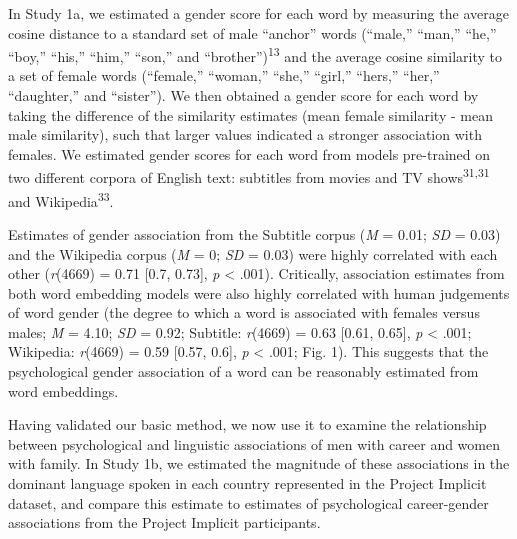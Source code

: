 \documentclass[11pt]{wlscirep}
\begin{document}
In Study 1a, we estimated a gender score for each word by measuring the average cosine distance to a standard set of
male \enquote{anchor} words (\enquote{male,} \enquote{man,}
\enquote{he,} \enquote{boy,} \enquote{his,} \enquote{him,}
\enquote{son,} and \enquote{brother})\textsuperscript{13}
and the average cosine similarity to a set of female words
(\enquote{female,} \enquote{woman,} \enquote{she,} \enquote{girl,}
\enquote{hers,} \enquote{her,} \enquote{daughter,} and
\enquote{sister}). We then obtained a gender score for each word by
taking the difference of the similarity estimates (mean female similarity
- mean male similarity), such that larger values indicated a stronger
association with females. We estimated  gender scores for each word from
models pre-trained on two different corpora of English text: subtitles from movies
and TV shows\textsuperscript{31,31} and Wikipedia\textsuperscript{33}.

Estimates of gender association from the Subtitle corpus (\emph{M} = 0.01;
\emph{SD} = 0.03) and the Wikipedia corpus (\emph{M} = 0; \emph{SD} =
0.03) were highly correlated with each other (\emph{r}(4669) = 0.71 {[}0.7, 0.73{]}, \emph{p} \textless{} .001). Critically, association estimates from both word embedding
models were also highly correlated with human judgements of word gender (the degree to which a word is associated with females versus males; \emph{M} = 4.10; \emph{SD} = 0.92; Subtitle: \emph{r}(4669) = 0.63 {[}0.61, 0.65{]}, \emph{p} \textless{} .001; Wikipedia: \emph{r}(4669) = 0.59 {[}0.57, 0.6{]}, \emph{p} \textless{} .001; Fig. 1). This suggests that the psychological gender association of a word can be reasonably estimated from word embeddings.

Having validated our basic method, we now use it to examine the relationship
between psychological and linguistic associations of men with career and women with family. In Study 1b, we
estimated the magnitude of these associations in the dominant language
spoken in each country represented in the Project Implicit dataset, and
compare this estimate to estimates of psychological career-gender associations from the
Project Implicit participants.
\end{document}
